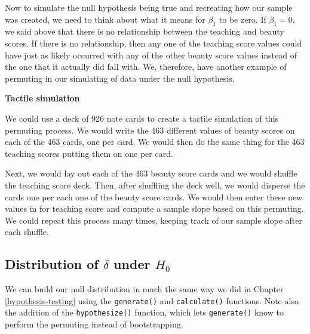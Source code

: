 \documentclass[12pt, krantz2,]{krantz}
\makeatletter
\newenvironment{Shaded}{\begin{snugshade}}{\end{snugshade}}
\newcommand{\DataTypeTok}[1]{\textcolor[rgb]{0.27,0.27,0.27}{#1}}
\newcommand{\DecValTok}[1]{\textcolor[rgb]{0.06,0.06,0.06}{#1}}
\newcommand{\KeywordTok}[1]{\textcolor[rgb]{0.27,0.27,0.27}{\textbf{#1}}}
\newcommand{\NormalTok}[1]{#1}
\newcommand{\OperatorTok}[1]{\textcolor[rgb]{0.43,0.43,0.43}{\textbf{#1}}}
\newcommand{\StringTok}[1]{\textcolor[rgb]{0.5,0.5,0.5}{#1}}
\newenvironment{kframe}{%
\medskip{}
\setlength{\fboxsep}{.8em}
 \def\at@end@of@kframe{}%
 \ifinner\ifhmode%
  \def\at@end@of@kframe{\end{minipage}}%
  \begin{minipage}{\columnwidth}%
 \fi\fi%
 \def\FrameCommand##1{\hskip\@totalleftmargin \hskip-\fboxsep
 \colorbox{shadecolor}{##1}\hskip-\fboxsep
     \hskip-\linewidth \hskip-\@totalleftmargin \hskip\columnwidth}%
 \MakeFramed {\advance\hsize-\width
   \@totalleftmargin\z@ \linewidth\hsize
   \@setminipage}}%
 {\par\unskip\endMakeFramed%
 \at@end@of@kframe}
\renewenvironment{Shaded}{\begin{kframe}}{\end{kframe}}
\makeatother
\begin{document}
Now to simulate the null hypothesis being true and recreating how our sample was created, we need to think about what it means for \(\beta_1\) to be zero. If \(\beta_1 = 0\), we said above that there is no relationship between the teaching and beauty scores. If there is no relationship, then any one of the teaching score values could have just as likely occurred with any of the other beauty score values instead of the one that it actually did fall with. We, therefore, have another example of permuting in our simulating of data under the null hypothesis.

\textbf{Tactile simulation}

We could use a deck of 926 note cards to create a tactile simulation of this permuting process. We would write the 463 different values of beauty scores on each of the 463 cards, one per card. We would then do the same thing for the 463 teaching scores putting them on one per card.

Next, we would lay out each of the 463 beauty score cards and we would shuffle the teaching score deck. Then, after shuffling the deck well, we would disperse the cards one per each one of the beauty score cards. We would then enter these new values in for teaching score and compute a sample slope based on this permuting. We could repeat this process many times, keeping track of our sample slope after each shuffle.

\hypertarget{distribution-of-delta-under-h_0-1}{%
\subsection{\texorpdfstring{Distribution of \(\delta\) under \(H_0\)}{Distribution of \textbackslash{}delta under H\_0}}\label{distribution-of-delta-under-h_0-1}}

We can build our null distribution in much the same way we did in Chapter \ref{hypothesis-testing} using the \texttt{generate()} and \texttt{calculate()} functions. Note also the addition of the \texttt{hypothesize()} function, which lets \texttt{generate()} know to perform the permuting instead of bootstrapping.

\begin{Shaded}
\end{Shaded}
\end{document}
